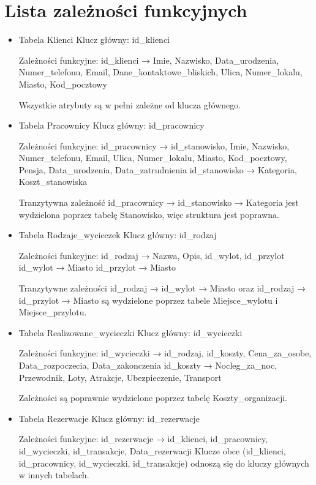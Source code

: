 \documentclass{article}
\theoremstyle{definition}
\begin{document}
	\section{Lista zależności funkcyjnych}
	\begin{itemize}
	\item Tabela Klienci
	Klucz główny: id\_klienci
	
	Zależności funkcyjne:
	id\_klienci → {Imie, Nazwisko, Data\_urodzenia, Numer\_telefonu, Email, Dane\_kontaktowe\_bliskich, Ulica, Numer\_lokalu, Miasto, Kod\_pocztowy}
	
	Wszystkie atrybuty są w pełni zależne od klucza głównego.
	
	\item Tabela Pracownicy
	Klucz główny: id\_pracownicy
	
	Zależności funkcyjne:
	id\_pracownicy → {id\_stanowisko, Imie, Nazwisko, Numer\_telefonu, Email, Ulica, Numer\_lokalu, Miasto, Kod\_pocztowy, Pensja, Data\_urodzenia, Data\_zatrudnienia}
	id\_stanowisko → {Kategoria, Koszt\_stanowiska}
	
	Tranzytywna zależność id\_pracownicy → id\_stanowisko → Kategoria jest wydzielona poprzez tabelę Stanowisko, więc struktura jest poprawna.
	
	\item Tabela Rodzaje\_wycieczek
	Klucz główny: id\_rodzaj
	
	Zależności funkcyjne:
	id\_rodzaj → {Nazwa, Opis, id\_wylot, id\_przylot}
	id\_wylot → Miasto 
	id\_przylot → Miasto 
	
	Tranzytywne zależności id\_rodzaj → id\_wylot → Miasto oraz id\_rodzaj → id\_przylot → Miasto są wydzielone poprzez tabele Miejsce\_wylotu i Miejsce\_przylotu.
	
	\item Tabela Realizowane\_wycieczki
	Klucz główny: id\_wycieczki
	
	Zależności funkcyjne:
	id\_wycieczki → {id\_rodzaj, id\_koszty, Cena\_za\_osobe, Data\_rozpoczecia, Data\_zakonczenia}
	id\_koszty → {Nocleg\_za\_noc, Przewodnik, Loty, Atrakcje, Ubezpieczenie, Transport} 
	
	Zależności są poprawnie wydzielone poprzez tabelę Koszty\_organizacji.
	
	\item Tabela Rezerwacje
	Klucz główny: id\_rezerwacje
	
	Zależności funkcyjne:
	id\_rezerwacje → {id\_klienci, id\_pracownicy, id\_wycieczki, id\_transakcje, Data\_rezerwacji}
	Klucze obce (id\_klienci, id\_pracownicy, id\_wycieczki, id\_transakcje) odnoszą się do kluczy głównych w innych tabelach.
	

\end{itemize}
\end{document}
